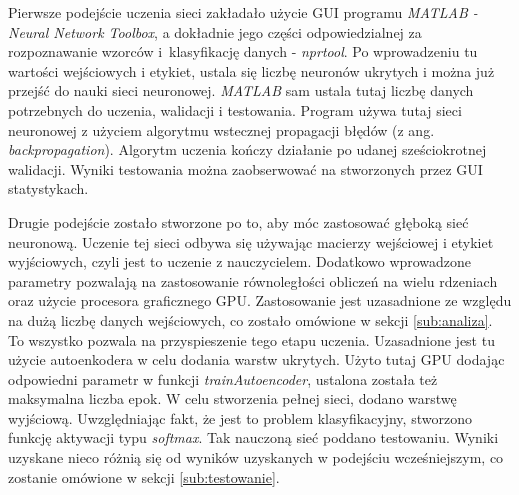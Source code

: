 Pierwsze podejście uczenia sieci zakładało użycie GUI programu \textit{MATLAB - Neural Network Toolbox}, a dokładnie jego części odpowiedzialnej za rozpoznawanie wzorców i~klasyfikację danych - \textit{nprtool}. Po wprowadzeniu tu wartości wejściowych i etykiet, ustala się liczbę neuronów ukrytych i można już przejść do nauki sieci neuronowej. \textit{MATLAB} sam ustala tutaj liczbę danych potrzebnych do uczenia, walidacji i testowania. Program używa tutaj sieci neuronowej z użyciem algorytmu wstecznej propagacji błędów (z ang. \textit{backpropagation}). Algorytm uczenia kończy działanie po udanej sześciokrotnej walidacji. Wyniki testowania można zaobserwować na stworzonych przez GUI statystykach.

Drugie podejście zostało stworzone po to, aby móc zastosować głęboką sieć neuronową. Uczenie tej sieci odbywa się używając macierzy wejściowej i etykiet wyjściowych, czyli jest to uczenie z nauczycielem. Dodatkowo wprowadzone parametry pozwalają na zastosowanie równoległości obliczeń na wielu rdzeniach oraz użycie procesora graficznego GPU. Zastosowanie jest uzasadnione ze względu na dużą liczbę danych wejściowych, co zostało omówione w sekcji \ref{sub:analiza}. To wszystko pozwala na przyspieszenie tego etapu uczenia. Uzasadnione jest tu użycie autoenkodera w celu dodania warstw ukrytych. Użyto tutaj GPU dodając odpowiedni parametr w funkcji \textit{trainAutoencoder}, ustalona została też maksymalna liczba epok. W celu stworzenia pełnej sieci, dodano warstwę wyjściową. Uwzględniając fakt, że jest to problem klasyfikacyjny, stworzono funkcję aktywacji typu \textit{softmax}. Tak nauczoną sieć poddano testowaniu. Wyniki uzyskane nieco różnią się od wyników uzyskanych w podejściu wcześniejszym, co zostanie omówione w sekcji \ref{sub:testowanie}.


